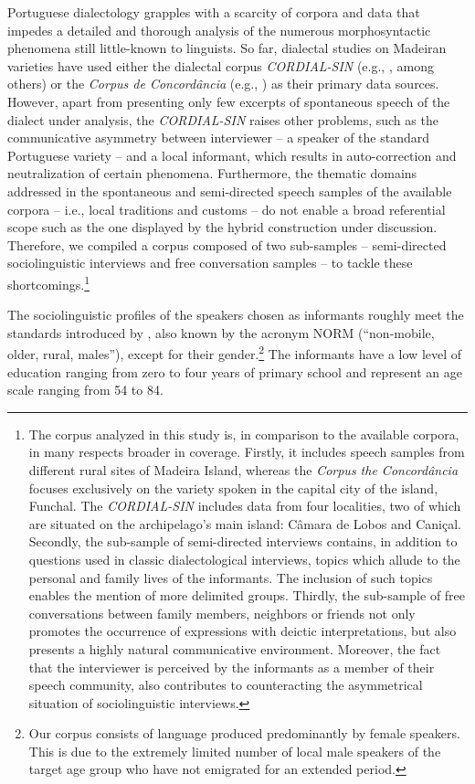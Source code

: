 \documentclass[output=paper]{langscibook}
\begin{document}
Portuguese dialectology grapples with a scarcity of corpora and data that impedes a detailed and thorough analysis of the numerous morphosyntactic phenomena still little-known to linguists. So far, dialectal studies on Madeiran varieties have used either the dialectal corpus \textit{CORDIAL-SIN} (e.g., \citealt{Martins2021}, among others) or the \textit{Corpus de Concordância} (e.g., \citealt{Bazenga2019,Bazenga2015}) as their primary data sources. However, apart from presenting only few excerpts of spontaneous speech of the dialect under analysis, the \textit{CORDIAL-SIN} raises other problems, such as the communicative asymmetry between interviewer  -- a speaker of the standard Portuguese variety --  and a local informant, which results in auto-correction and neutralization of certain phenomena. Furthermore, the thematic domains addressed in the spontaneous and semi-directed speech samples of the available corpora  -- i.e., local traditions and customs --  do not enable a broad referential scope such as the one displayed by the hybrid construction under discussion. Therefore, we compiled a corpus composed of two sub-samples  -- semi-directed sociolinguistic interviews and free conversation samples --  to tackle these shortcomings.\footnote{The corpus analyzed in this study is, in comparison to the available corpora, in many respects broader in coverage. Firstly, it includes speech samples from different rural sites of Madeira Island, whereas the \textit{Corpus the Concordância} focuses exclusively on the variety spoken in the capital city of the island, Funchal. The \textit{CORDIAL-SIN} includes data from four localities, two of which are situated on the archipelago’s main island: Câmara de Lobos and Caniçal. Secondly, the sub-sample of semi-directed interviews contains, in addition to questions used in classic dialectological interviews, topics which allude to the personal and family lives of the informants. The inclusion of such topics enables the mention of more delimited groups. Thirdly, the sub-sample of free conversations between family members, neighbors or friends not only promotes the occurrence of  expressions with deictic interpretations, but also presents a highly natural communicative environment. Moreover, the fact that the interviewer is perceived by the informants as a member of their speech community, also contributes to counteracting the asymmetrical situation of sociolinguistic interviews.} 



The sociolinguistic profiles of the speakers chosen as informants roughly meet the standards introduced by \citet{ChambersTrudgill1980}, also known by the acronym NORM (“non-mobile, older, rural, males”), except for their gender.\footnote{Our corpus consists of language produced predominantly by female speakers. This is due to the extremely limited number of local male speakers of the target age group who have not emigrated for an extended period.} The informants have a low level of education ranging from zero to four years of primary school and represent an age scale ranging from 54 to 84.
\end{document}
